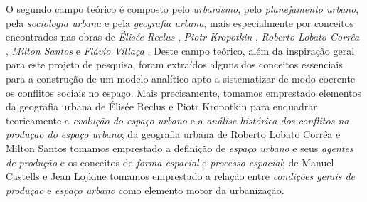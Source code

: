 O segundo campo teórico é composto pelo \textit{urbanismo}, pelo \textit{planejamento urbano}, pela \textit{sociologia urbana} e pela \textit{geografia urbana}, mais especialmente por conceitos encontrados nas obras de \textit{Élisée Reclus} \cite{RECLUS1905a, reclus_renovacao_2010, RECLUS1905e}, \textit{Piotr Kropotkin} \cite{KROPOTKIN1955, KROPOTKIN2005f, KROPOTKIN2009}, \textit{Roberto Lobato Corrêa} \cite{CORREA1985espa, CORREA1997}, \textit{Milton Santos} \cite{santos_espmetodo_2008, SANTOS2008, santos_totallugar_2008, santos_ecopolcid_2009} e \textit{Flávio Villaça} \cite{villaca_intraurbano_2017}. Deste campo teórico, além da inspiração geral para este projeto de pesquisa, foram extraídos alguns dos conceitos essenciais para a construção de um modelo analítico apto a sistematizar de modo coerente os conflitos sociais no espaço. Mais precisamente, tomamos emprestado elementos da geografia urbana de Élisée Reclus e Piotr Kropotkin  para enquadrar teoricamente a \textit{evolução do espaço urbano} e a \textit{análise histórica dos conflitos na produção do espaço urbano}; da geografia urbana de Roberto Lobato Corrêa e Milton Santos tomamos emprestado a definição de \textit{espaço urbano} e seus \textit{agentes de produção} e os conceitos de \textit{forma espacial} e \textit{processo espacial}; de Manuel Castells e Jean Lojkine tomamos emprestado a relação entre \textit{condições gerais de produção} e \textit{espaço urbano} como elemento motor da urbanização.

